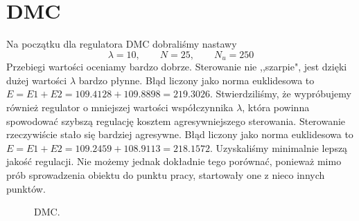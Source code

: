 \section{DMC}
Na początku dla regulatora DMC dobraliśmy nastawy
\begin{equation}
  \lambda=10, \qquad N=25, \qquad N_u=250
\end{equation}
Przebiegi wartości oceniamy bardzo dobrze. Sterowanie nie ,,szarpie", jest dzięki dużej wartości $\lambda$ bardzo
płynne. Błąd liczony jako norma euklidesowa to $E = E1 + E2 = 109.4128 + 109.8898 = 219.3026$.
Stwierdziliśmy, że wypróbujemy również regulator o mniejszej wartości współczynnika $\lambda$, która powinna spowodować szybszą regulację kosztem agresywniejszego sterowania. Sterowanie rzeczywiście stało
się bardziej agresywne.
Błąd liczony jako norma euklidesowa to $E = E1 + E2 = 109.2459 + 108.9113 = 218.1572$. Uzyskaliśmy minimalnie lepszą jakość regulacji. Nie możemy jednak dokładnie tego porównać,
ponieważ mimo prób sprowadzenia obiektu do punktu pracy, startowały one z nieco innych punktów.

\begin{figure}[tb]
\centering
{}
\caption{DMC.}
\label{fig:dmc}
\end{figure}

